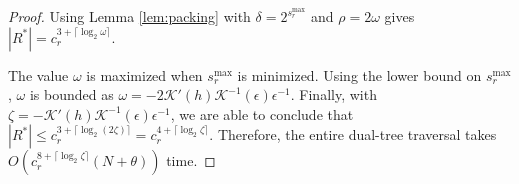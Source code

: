 \begin{proof}
Using Lemma \ref{lem:packing} with $\delta = 2^{s_r^{\max}}$ and $\rho = 2
\omega$ gives $|R^*| = c_r^{3 + \lceil \log_2 \omega \rceil}$.







The value $\omega$ is maximized when $s_r^{\max}$ is minimized.  Using the lower
bound on $s_r^{\max}$, $\omega$ is bounded as
%
$\omega = -2 \mathcal{K}'(h) \mathcal{K}^{-1}(\epsilon) \epsilon^{-1}$.
%
Finally, with $\zeta = -\mathcal{K}'(h) \mathcal{K}^{-1}(\epsilon)
\epsilon^{-1}$, we are able to conclude that $|R^*| \le c_r^{3 + \lceil \log_2
(2 \zeta ) \rceil} = c_r^{4 + \lceil \log_2 \zeta \rceil}$.  Therefore, the
entire dual-tree traversal takes $O(c_r^{8 + \lceil \log_2 \zeta \rceil} (N +
\theta))$ time.


\end{proof}
